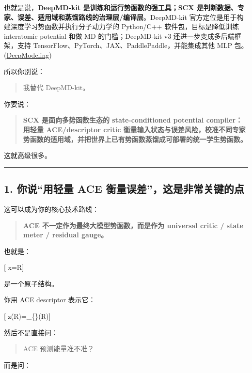 \documentclass[
  12pt,
]{ctexart}
\begin{document}
也就是说，\textbf{DeepMD-kit 是训练和运行势函数的强工具；SCX
是判断数据、专家、误差、适用域和蒸馏路线的治理层/编译层}。DeepMD-kit
官方定位是用于构建深度学习势函数并执行分子动力学的 Python/C++
软件包，目标是降低训练 interatomic potential 和做 MD 的门槛；DeepMD-kit
v3 还进一步变成多后端框架，支持
TensorFlow、PyTorch、JAX、PaddlePaddle，并能集成其他 MLP
包。(\href{https://arxiv.org/html/2406.17557v1?utm_source=chatgpt.com}{DeepModeling})

所以你别说：

\begin{quote}
我替代 DeepMD-kit。
\end{quote}

你要说：

\begin{quote}
\textbf{SCX 是面向多势函数生态的 state-conditioned potential
compiler：用轻量 ACE/descriptor critic
衡量输入状态与误差风险，校准不同专家势函数的适用域，并把世界上已有势函数蒸馏成可部署的统一学生势函数。}
\end{quote}

这就高级很多。

\begin{center}\rule{0.5\linewidth}{0.5pt}\end{center}

\subsection{1. 你说``用轻量 ACE
衡量误差''，这是非常关键的点}\label{ux4f60ux8bf4ux7528ux8f7bux91cf-ace-ux8861ux91cfux8befux5deeux8fd9ux662fux975eux5e38ux5173ux952eux7684ux70b9}

这可以成为你的核心技术路线：

\begin{quote}
\textbf{ACE 不一定作为最终大模型势函数，而是作为 universal critic /
state meter / residual gauge。}
\end{quote}

也就是：

{[} x=R{]}

是一个原子结构。

你用 ACE descriptor 表示它：

{[} z(R)=\Phi\_\{\}(R){]}

然后不是直接问：

\begin{quote}
ACE 预测能量准不准？
\end{quote}

而是问：
\end{document}
